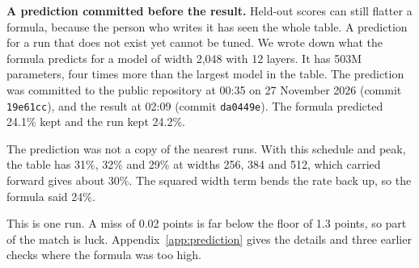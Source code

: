 \documentclass{article}
\begin{document}
\textbf{A prediction committed before the result.} Held-out scores can still flatter a formula, because the person who writes it has seen the whole table. A prediction for a run that does not exist yet cannot be tuned. We wrote down what the formula predicts for a model of width 2,048 with 12 layers. It has 503M parameters, four times more than the largest model in the table. The prediction was committed to the public repository at 00:35 on 27 November 2026 (commit \texttt{19e61cc}), and the result at 02:09 (commit \texttt{da0449e}). The formula predicted 24.1\% kept and the run kept 24.2\%.

The prediction was not a copy of the nearest runs. With this schedule and peak, the table has 31\%, 32\% and 29\% at widths 256, 384 and 512, which carried forward gives about 30\%. The squared width term bends the rate back up, so the formula said 24\%.

This is one run. A miss of 0.02 points is far below the floor of 1.3 points, so part of the match is luck. Appendix~\ref{app:prediction} gives the details and three earlier checks where the formula was too high.
\end{document}
